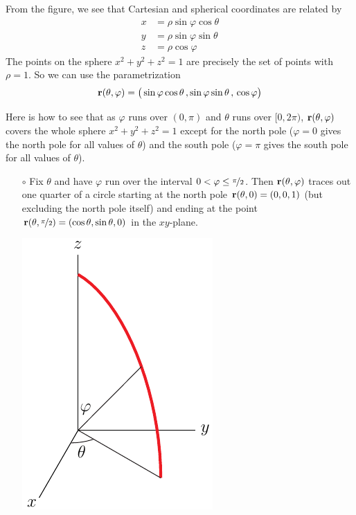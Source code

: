 \begin{eg}[Sphere]
\begin{efig}
\begin{center}
\end{center}
\end{efig}
From the figure, we see that Cartesian and spherical coordinates
are related by
\begin{align*}
x&=\rho\sin\varphi\cos\theta \\
y&=\rho\sin\varphi\sin\theta \\
z&=\rho\cos\varphi
\end{align*}
The points on the sphere $x^2+y^2+z^2=1$ are precisely the set of points 
with $\rho=1$. So we can use the parametrization
\begin{equation*}
\mathbf{r}(\theta,\varphi)
=\big(\sin\varphi\cos\theta\,,\sin\varphi\sin\theta\,,\,\cos\varphi\big)
\end{equation*}

Here is how to see that as $\varphi$ runs over $(0,\pi)$ and $\theta$ 
runs over $[0,2\pi)$, $\mathbf{r}(\theta,\varphi)$ covers the whole 
sphere $x^2+y^2+z^2=1$ except for the north pole ($\varphi=0$ gives 
the north pole for all values of $\theta$) and the south pole 
($\varphi=\pi$ gives the south pole for all values of $\theta$). 

\begin{itemize}\itemsep1pt \parskip0pt  %
\item[$\circ$]Fix $\theta$ and have $\varphi$ run over the interval 
$0<\varphi\le \nicefrac{\pi}{2}$. Then $\mathbf{r}(\theta,\varphi)$ traces out one quarter of a circle starting at the north pole $\mathbf{r}(\theta,0) = (0,0,1)$
(but excluding the north pole itself) and ending at the point
$\mathbf{r}(\theta,\nicefrac{\pi}{2}) = (\cos\theta,\sin\theta,0)$ in the $xy$-plane.
\begin{nfig}
\begin{center} 
   \includegraphics{sphericalRngA.pdf}
\end{center}
\end{nfig}


\end{itemize}
\end{eg}
